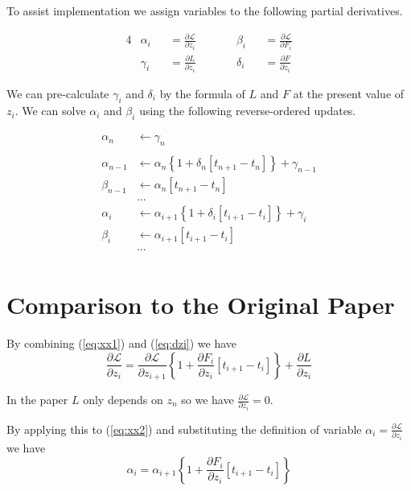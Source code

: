 \documentclass{article}
\newcommand{\LL}{{\mathcal L}}
\begin{document}
To assist implementation we assign variables to the following partial derivatives.

\begin{alignat*}{4}
	& \alpha_i &&= \frac{\partial \LL}{\partial z_i} \qquad && \beta_i &&= \frac{\partial \LL}{\partial F_i} \\
	& \gamma_i &&= \frac{\partial L}{\partial z_i}  \qquad && \delta_i &&= \frac{\partial F}{\partial z_i}
\end{alignat*}

We can pre-calculate $\gamma_i$ and $\delta_i$ by the formula of $L$ and $F$ at the present value of $z_i$.  We can solve $\alpha_i$ and $\beta_i$ using the following reverse-ordered updates.

\begin{align*}
	\alpha_n     &\leftarrow \gamma_n \\
		     &\\
	\alpha_{n-1} &\leftarrow \alpha_n \left\{1 + \delta_n [ t_{n+1} - t_n]\right\} + \gamma_{n-1} \\
	\beta_{n-1} &\leftarrow \alpha_n [t_{n+1} - t_n] \\
		     &...\\
	\alpha_i     &\leftarrow \alpha_{i+1} \left\{1 + \delta_i [ t_{i+1} - t_i]\right\} + \gamma_i \\
	\beta_i     &\leftarrow \alpha_{i+1} [t_{i+1} - t_i] \\
		     &...\\
\end{align*}

\section{Comparison to the Original Paper}

By combining (\ref{eq:xx1}) and (\ref{eq:dzi}) we have
\begin{equation}
\label{eq:xx2}
\frac{\partial \LL}{\partial z_i} = \frac{\partial \LL}{\partial z_{i+1}}\left\{1 + \frac{\partial F_i}{\partial z_i} [t_{i+1}-t_i]\right\} + \frac{\partial L}{\partial z_i}
\end{equation}

In the paper $L$ only depends on $z_n$ so we have $\frac{\partial \LL}{\partial z_i} = 0$.  

By applying this to (\ref{eq:xx2}) and substituting the definition of variable $\alpha_i =  \frac{\partial \LL}{\partial z_i}$ we have
$$
\alpha_i = \alpha_{i+1} \left\{1 + \frac{\partial F_i}{\partial z_i} [t_{i+1}-t_i]\right\}
$$
\end{document}
